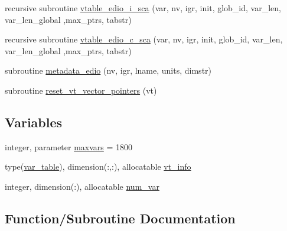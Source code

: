 \begin{DoxyCompactItemize}
\item 
recursive subroutine \hyperlink{namespaceed__var__tables_a9729653cf659295bb68d54f3979f7615}{vtable\+\_\+edio\+\_\+i\+\_\+sca} (var, nv, igr, init, glob\+\_\+id, var\+\_\+len, var\+\_\+len\+\_\+global                                                                                                                                                                       ,max\+\_\+ptrs, tabstr)
\item 
recursive subroutine \hyperlink{namespaceed__var__tables_a9bcc45986b101b7495287ad999e5d52e}{vtable\+\_\+edio\+\_\+c\+\_\+sca} (var, nv, igr, init, glob\+\_\+id, var\+\_\+len, var\+\_\+len\+\_\+global                                                                                                                                                                       ,max\+\_\+ptrs, tabstr)
\item 
subroutine \hyperlink{namespaceed__var__tables_a163fc43f01ed02a236a290d4b1d9575b}{metadata\+\_\+edio} (nv, igr, lname, units, dimstr)
\item 
subroutine \hyperlink{namespaceed__var__tables_aed76c1293872b5f6cf4c39c0747d2bb4}{reset\+\_\+vt\+\_\+vector\+\_\+pointers} (vt)
\end{DoxyCompactItemize}
\subsection*{Variables}
\begin{DoxyCompactItemize}
\item 
integer, parameter \hyperlink{namespaceed__var__tables_a932cd6738531dd3348d40636bd8a20ae}{maxvars} = 1800
\item 
type(\hyperlink{structed__var__tables_1_1var__table}{var\+\_\+table}), dimension(\+:,\+:), allocatable \hyperlink{namespaceed__var__tables_a949fa9110a835bd59e16bd0a5e153498}{vt\+\_\+info}
\item 
integer, dimension(\+:), allocatable \hyperlink{namespaceed__var__tables_ae879757190201e461d3bc09131321a64}{num\+\_\+var}
\end{DoxyCompactItemize}


\subsection{Function/\+Subroutine Documentation}
\hypertarget{namespaceed__var__tables_a163fc43f01ed02a236a290d4b1d9575b}{}
